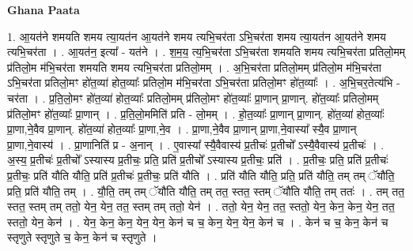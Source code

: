 \documentclass[17pt]{extarticle}
\begin{document}
\textbf{Ghana Paata } \newline

1. आ॒यत॑ने शमयति शमय त्या॒यत॑न आ॒यत॑ने शमय त्यभि॒चर॑ता ऽभि॒चर॑ता शमय त्या॒यत॑न आ॒यत॑ने शमय त्यभि॒चर॑ता । . आ॒यत॑न॒ इत्या᳚ - यत॑ने । . श॒म॒य॒ त्य॒भि॒चर॑ता ऽभि॒चर॑ता शमयति शमय त्यभि॒चर॑ता प्रतिलो॒मम् प्र॑तिलो॒म म॑भि॒चर॑ता शमयति शमय त्यभि॒चर॑ता प्रतिलो॒मम् । . अ॒भि॒चर॑ता प्रतिलो॒मम् प्र॑तिलो॒म म॑भि॒चर॑ता ऽभि॒चर॑ता प्रतिलो॒मꣳ हो॑त॒व्या॑ होत॒व्याः᳚ प्रतिलो॒म म॑भि॒चर॑ता ऽभि॒चर॑ता प्रतिलो॒मꣳ हो॑त॒व्याः᳚ । . अ॒भि॒चर॒तेत्य॑भि - चर॑ता । . प्र॒ति॒लो॒मꣳ हो॑त॒व्या॑ होत॒व्याः᳚ प्रतिलो॒मम् प्र॑तिलो॒मꣳ हो॑त॒व्याः᳚ प्रा॒णान् प्रा॒णान्. हो॑त॒व्याः᳚ प्रतिलो॒मम् प्र॑तिलो॒मꣳ हो॑त॒व्याः᳚ प्रा॒णान् । . प्र॒ति॒लो॒ममिति॑ प्रति - लो॒मम् । . हो॒त॒व्याः᳚ प्रा॒णान् प्रा॒णान्. हो॑त॒व्या॑ होत॒व्याः᳚ प्रा॒णा,ने॒वैव प्रा॒णान्. हो॑त॒व्या॑ होत॒व्याः᳚ प्रा॒णा,ने॒व । . प्रा॒णा,ने॒वैव प्रा॒णान् प्रा॒णा,ने॒वास्या᳚ स्यै॒व प्रा॒णान् प्रा॒णा,ने॒वास्य॑ । . प्रा॒णानिति॑ प्र - अ॒नान् । . ए॒वास्या᳚ स्यै॒वैवास्य॑ प्र॒तीचः॑ प्र॒तीचो᳚ ऽस्यै॒वैवास्य॑ प्र॒तीचः॑ । . अ॒स्य॒ प्र॒तीचः॑ प्र॒तीचो᳚ ऽस्यास्य प्र॒तीचः॒ प्रति॒ प्रति॑ प्र॒तीचो᳚ ऽस्यास्य प्र॒तीचः॒ प्रति॑ । . प्र॒तीचः॒ प्रति॒ प्रति॑ प्र॒तीचः॑ प्र॒तीचः॒ प्रति॑ यौति यौति॒ प्रति॑ प्र॒तीचः॑ प्र॒तीचः॒ प्रति॑ यौति । . प्रति॑ यौति यौति॒ प्रति॒ प्रति॑ यौति॒ तम् तम् ॅयौ॑ति॒ प्रति॒ प्रति॑ यौति॒ तम् । . यौ॒ति॒ तम् तम् ॅयौ॑ति यौति॒ तम् तत॒ स्तत॒ स्तम् ॅयौ॑ति यौति॒ तम् ततः॑ । . तम् तत॒ स्तत॒ स्तम् तम् ततो॒ येन॒ येन॒ तत॒ स्तम् तम् ततो॒ येन॑ । . ततो॒ येन॒ येन॒ तत॒ स्ततो॒ येन॒ केन॒ केन॒ येन॒ तत॒ स्ततो॒ येन॒ केन॑ । . येन॒ केन॒ केन॒ येन॒ येन॒ केन॑ च च॒ केन॒ येन॒ येन॒ केन॑ च । . केन॑ च च॒ केन॒ केन॑ च स्तृणुते स्तृणुते च॒ केन॒ केन॑ च स्तृणुते । \newline
\end{document}
